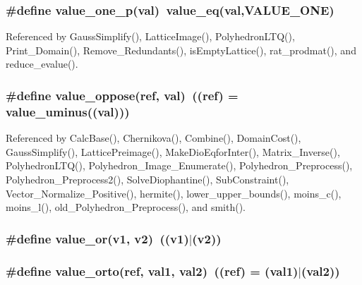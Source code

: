 \subsubsection{\setlength{\rightskip}{0pt plus 5cm}\#define value\_\-one\_\-p(val)\ value\_\-eq(val,VALUE\_\-ONE)}\label{arithmetique_8h_a69}




Referenced by Gauss\-Simplify(), Lattice\-Image(), Polyhedron\-LTQ(), Print\_\-Domain(), Remove\_\-Redundants(), is\-Empty\-Lattice(), rat\_\-prodmat(), and reduce\_\-evalue().

\subsubsection{\setlength{\rightskip}{0pt plus 5cm}\#define value\_\-oppose(ref, val)\ ((ref) = value\_\-uminus((val)))}\label{arithmetique_8h_a54}




Referenced by Calc\-Base(), Chernikova(), Combine(), Domain\-Cost(), Gauss\-Simplify(), Lattice\-Preimage(), Make\-Dio\-Eqfor\-Inter(), Matrix\_\-Inverse(), Polyhedron\-LTQ(), Polyhedron\_\-Image\_\-Enumerate(), Polyhedron\_\-Preprocess(), Polyhedron\_\-Preprocess2(), Solve\-Diophantine(), Sub\-Constraint(), Vector\_\-Normalize\_\-Positive(), hermite(), lower\_\-upper\_\-bounds(), moins\_\-c(), moins\_\-l(), old\_\-Polyhedron\_\-Preprocess(), and smith().

\subsubsection{\setlength{\rightskip}{0pt plus 5cm}\#define value\_\-or(v1, v2)\ ((v1)$|$(v2))}\label{arithmetique_8h_a39}


\subsubsection{\setlength{\rightskip}{0pt plus 5cm}\#define value\_\-orto(ref, val1, val2)\ ((ref) = (val1)$|$(val2))}\label{arithmetique_8h_a58}




